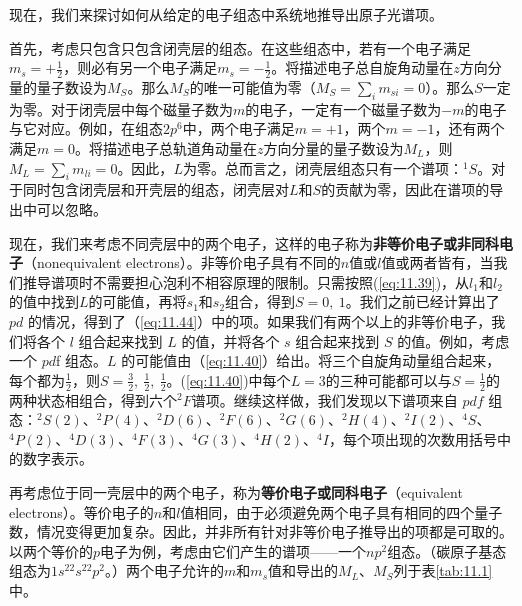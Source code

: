     现在，我们来探讨如何从给定的电子组态中系统地推导出原子光谱项。

    首先，考虑只包含只包含闭壳层的组态。在这些组态中，若有一个电子满足$m_s = +\frac{1}{2}$，则必有另一个电子满足$m_s = -\frac{1}{2}$。将描述电子总自旋角动量在$z$方向分量的量子数设为$M_S$。那么$M_S$的唯一可能值为零（$M_S = \sum_{i}m_{si} = 0$）。那么$S$一定为零。对于闭壳层中每个磁量子数为$m$的电子，一定有一个磁量子数为$-m$的电子与它对应。例如，在组态$2p^6$中，两个电子满足$m = +1$，两个$m = -1$，还有两个满足$m=0$。将描述电子总轨道角动量在$z$方向分量的量子数设为$M_L$，则$M_L = \sum_{i}m_{li} = 0$。因此，$L$为零。总而言之，闭壳层组态只有一个谱项：$^1S$。对于同时包含闭壳层和开壳层的组态，闭壳层对$L$和$S$的贡献为零，因此在谱项的导出中可以忽略。

    现在，我们来考虑不同壳层中的两个电子，这样的电子称为\textbf{非等价电子或非同科电子}（nonequivalent electrons）。非等价电子具有不同的$n$值或$l$值或两者皆有，当我们推导谱项时不需要担心泡利不相容原理的限制。只需按照(\ref{eq:11.39})，从$l_1$和$l_2$的值中找到$L$的可能值，再将$s_1$和$s_2$组合，得到$S = 0,\:1$。我们之前已经计算出了 $pd$ 的情况，得到了（\ref{eq:11.44}）中的项。如果我们有两个以上的非等价电子，我们将各个 $l$ 组合起来找到 $L$ 的值，并将各个 $s$ 组合起来找到 $S$ 的值。例如，考虑一个 $pd$f 组态。$L$ 的可能值由（\ref{eq:11.40}）给出。将三个自旋角动量组合起来，每个都为$\frac{1}{2}$，则$S = \frac{3}{2},\:\frac{1}{2},\:\frac{1}{2}$。(\ref{eq:11.40})中每个$L=3$的三种可能都可以与$S = \frac{1}{2}$的两种状态相组合，得到六个$^2F$谱项。继续这样做，我们发现以下谱项来自 $pdf$ 组态：$^2S\left(2\right)$、$^2P\left(4\right)$、$^2D\left(6\right)$、$^2F\left(6\right)$、$^2G\left(6\right)$、$^2H\left(4\right)$、$^2I\left(2\right)$、$^4S$、$^4P\left(2\right)$、$^4D\left(3\right)$、$^4F\left(3\right)$、$^4G\left(3\right)$、$^4H\left(2\right)$、$^4I$，每个项出现的次数用括号中的数字表示。

    再考虑位于同一壳层中的两个电子，称为\textbf{等价电子或同科电子}（equivalent electrons）。等价电子的$n$和$l$值相同，由于必须避免两个电子具有相同的四个量子数，情况变得更加复杂。因此，并非所有针对非等价电子推导出的项都是可取的。以两个等价的$p$电子为例，考虑由它们产生的谱项——一个$np^2$组态。（碳原子基态组态为$1s^22s^22p^2$。）两个电子允许的$m$和$m_s$值和导出的$M_L$、$M_S$列于表\ref{tab:11.1}中。

